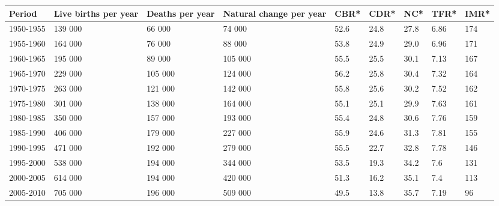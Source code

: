 \documentclass{article}
\begin{document}
\begin{tabular}{lllllllll}
\toprule
Period & Live births per year & Deaths per year & Natural change per year & CBR* & CDR* & NC* & TFR* & IMR* \\
\midrule
1950-1955 & 139 000 & 66 000 & 74 000 & 52.6 & 24.8 & 27.8 & 6.86 & 174 \\
1955-1960 & 164 000 & 76 000 & 88 000 & 53.8 & 24.9 & 29.0 & 6.96 & 171 \\
1960-1965 & 195 000 & 89 000 & 105 000 & 55.5 & 25.5 & 30.1 & 7.13 & 167 \\
1965-1970 & 229 000 & 105 000 & 124 000 & 56.2 & 25.8 & 30.4 & 7.32 & 164 \\
1970-1975 & 263 000 & 121 000 & 142 000 & 55.8 & 25.6 & 30.2 & 7.52 & 162 \\
1975-1980 & 301 000 & 138 000 & 164 000 & 55.1 & 25.1 & 29.9 & 7.63 & 161 \\
1980-1985 & 350 000 & 157 000 & 193 000 & 55.4 & 24.8 & 30.6 & 7.76 & 159 \\
1985-1990 & 406 000 & 179 000 & 227 000 & 55.9 & 24.6 & 31.3 & 7.81 & 155 \\
1990-1995 & 471 000 & 192 000 & 279 000 & 55.5 & 22.7 & 32.8 & 7.78 & 146 \\
1995-2000 & 538 000 & 194 000 & 344 000 & 53.5 & 19.3 & 34.2 & 7.6 & 131 \\
2000-2005 & 614 000 & 194 000 & 420 000 & 51.3 & 16.2 & 35.1 & 7.4 & 113 \\
2005-2010 & 705 000 & 196 000 & 509 000 & 49.5 & 13.8 & 35.7 & 7.19 & 96 \\
\bottomrule
\end{tabular}
\end{document}
